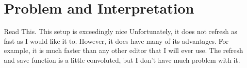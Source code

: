 \section{Problem and Interpretation}
Read This. This setup is exceedingly nice
Unfortunately, it does not refresh as fast as I would like it to.
However, it does have many of its advantages.
For example, it is much faster than any other editor that I will ever use.
The refresh and save function is a little convoluted, but I don't have much problem with it.

